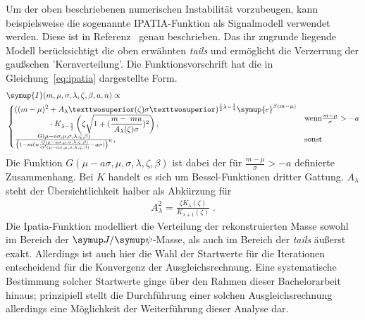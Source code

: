 %
Um der oben beschriebenen numerischen Instabilität vorzubeugen, kann beispielsweise die sogenannte IPATIA-Funktion als Signalmodell verwendet werden. Diese ist in Referenz~\cite{ipatia} genau beschrieben. Das ihr zugrunde liegende Modell berücksichtigt die oben erwähnten \textit{tails} und ermöglicht die Verzerrung der gaußschen 'Kernverteilung'. Die Funktionsvorschrift hat die in Gleichung~\ref{eq:ipatia} dargestellte Form.
%
\begin{equation}
  \begin{split}
  &\symup{I}(m,\mu,\sigma,\lambda,\zeta,\beta,a,n)\propto\\
    &\begin{cases}
      \begin{split}
      ((m-\mu)^2&+A_\lambda²(\zeta)\sigma²)^{\frac{1}{2}\lambda-\frac{1}{4}}\symup{e}^{\beta(m-\mu)}\\
      &\cdot K_{\lambda-\frac{1}{2}}\left(\zeta\sqrt{1+(\frac{m-\ mu}{A_\lambda(\zeta)\sigma})^2}\right),
      \end{split} & \text{wenn} \frac{m-\mu}{\sigma}>-a \\
      \frac{G(\mu-a\sigma,\mu,\sigma,\lambda,\zeta,\beta)}{\left(1-m\/(n\frac{G(\mu-a\sigma,\mu,\sigma,\lambda,\zeta,\beta)}{G'(\mu-a\sigma,\mu,\sigma,\lambda,\zeta,\beta)}-a\sigma)\right)^n} ,& \text{sonst}
    \end{cases}
  \end{split}
  \label{eq:ipatia}
\end{equation}
%
Die Funktion $G(\mu-a\sigma,\mu,\sigma,\lambda,\zeta,\beta)$ ist dabei der für $\frac{m-\mu}{\sigma}>-a$ definierte Zusammenhang. Bei $K$
handelt es sich um Bessel-Funktionen dritter Gattung. $A_\lambda$ steht der Übersichtlichkeit halber als Abkürzung für
%
\begin{align*}
  A_\lambda^2=\frac{\zeta K_\lambda(\zeta)}{K_{\lambda+1}(\zeta)}\; .
\end{align*}
%
Die Ipatia-Funktion modelliert die Verteilung der rekonstruierten Masse sowohl im Bereich der $\jpsi$-Masse, als auch im Bereich der \textit{tails} äußerst exakt. Allerdings ist auch hier die Wahl der Startwerte für die Iterationen entscheidend für die Konvergenz der Ausgleichsrechnung. Eine systematische Bestimmung solcher Startwerte ginge über den Rahmen dieser Bachelorarbeit hinaus; prinzipiell stellt die Durchführung einer solchen Ausgleichsrechnung allerdings eine Möglichkeit der Weiterführung dieser Analyse dar.
